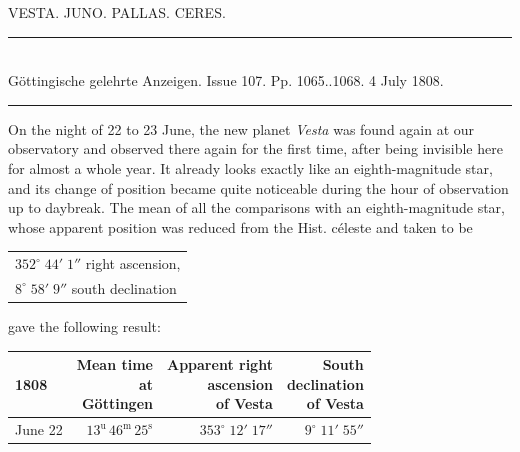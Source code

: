 \begin{center}
VESTA. JUNO. PALLAS. CERES.
\end{center}

\begin{center}
\rule{4cm}{0.4pt}\\
\fontsize{10}{12}\selectfont Göttingische gelehrte Anzeigen. Issue 107. Pp. 1065..1068. 4 July 1808.\\
\rule{4cm}{0.4pt}
\end{center}

On the night of 22 to 23 June, the new planet \emph{Vesta} was found again at our observatory and observed there again for the first time, after being invisible here for almost a whole year. It already looks exactly like an eighth-magnitude star, and its change of position became quite noticeable during the hour of observation up to daybreak. The mean of all the comparisons with an eighth-magnitude star, whose apparent position was reduced from the Hist. céleste and taken to be


\begin{center}\fontsize{10}{12}\selectfont\setlength{\tabcolsep}{3pt}\renewcommand{\arraystretch}{1.15}\begin{tabular}{l}
$352^\circ\;44'\;1''$ right ascension,\\
$8^\circ\;58'\;9''$ south declination
\end{tabular}\end{center}


\noindent gave the following result:


\begin{center}\fontsize{10}{12}\selectfont\setlength{\tabcolsep}{3pt}\renewcommand{\arraystretch}{1.15}\begin{tabular}{lrrr}
1808 & \shortstack{Mean time\\at\\Göttingen} & \shortstack{Apparent right\\ascension\\of Vesta} & \shortstack{South\\declination\\of Vesta}\\\hline
June 22 & $13^{\text{u}}\,46^{\text{m}}\,25^{\text{s}}$ & $353^\circ\;12'\;17''$ & $9^\circ\;11'\;55''$\\
\end{tabular}\end{center}


